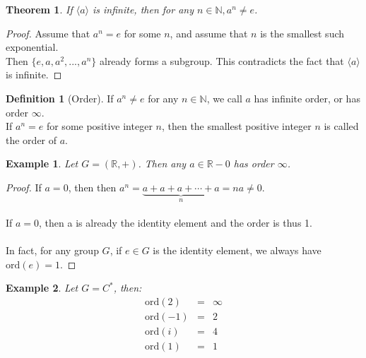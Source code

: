 \documentclass{article}
\theoremstyle{MyNonumberplain}
\theoremstyle{break}
\newtheorem*{proof}{Proof. }
\newcommand{\R}{\mathbb{R}}
\newcommand{\N}{\mathbb{N}}
\newcommand{\cyclic}[1]{\langle #1 \rangle}
\newcommand{\ord}[1]{\text{ord}(#1)}
\theoremstyle{break}
\newtheorem{theorem}{Theorem}[section]
\newtheorem{example}{Example}[section]
\theoremstyle{break}
\theoremstyle{definition}
\theoremstyle{break}
\newtheorem{definition}{Definition}[section]
\begin{document}
\begin{thmbox}
    \begin{theorem}
        If $\cyclic{a}$ is infinite, then for any $n\in\N, a^n \neq e$.
    \end{theorem}
    \begin{prfbox}
        \begin{proof}
            Assume that $a^n=e$ for some $n$, and assume that $n$ is the smallest such exponential.\\
            Then $\{e,a,a^2,...,a^n\}$ already forms a subgroup. This contradicts the fact that $\cyclic{a}$ is infinite.
        \end{proof}
    \end{prfbox}    
\end{thmbox}


\begin{defbox}
    \begin{definition}[Order]
        If $a^n\neq e$ for any $n\in\N$, we call $a$ has infinite order, or has order $\infty$.\\
        If $a^n=e$ for some positive integer $n$, then the smallest positive integer $n$ is called the order of $a$.
    \end{definition}
\end{defbox}

\begin{expbox}
    \begin{example}
        Let $G=(\R,+)$. Then any $a\in\R-{0}$ has order $\infty$.
    \end{example}

    \begin{prfbox}
        \begin{proof}
            If $a=0$, then then $a^n = \underset{n}{\underbrace{a + a + a + \cdots + a}} = n a \neq 0$.\\\\
            If $a=0$, then a is already the identity element and the order is thus 1.\\\\
            In fact, for any group $G$, if $e\in G$ is the identity element, we always have $\ord{e}=1$. 
        \end{proof}
    \end{prfbox}
    
\end{expbox}



\begin{expbox}
    \begin{example}
        Let $G=C^*$, then:
        \begin{eqnarray*}
            \ord{2} & = & \infty \\
            \ord{-1} & = & 2\\
            \ord{i} & = & 4\\
            \ord{1} & = & 1\\
        \end{eqnarray*}
    \end{example}
\end{expbox}
\end{document}
